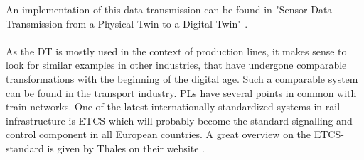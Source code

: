 An implementation of this data transmission can be found in "Sensor Data Transmission from a Physical Twin to a Digital Twin" \cite{AlaDTdataTransmission}.\\
\\
As the \ac{DT} is mostly used in the context of production lines, it makes sense to look for similar examples in other industries, that have undergone comparable transformations with the beginning of the digital age.
Such a comparable system can be found in the transport industry. 
\acp{PL} have several points in common with train networks.
One of the latest internationally standardized systems in rail infrastructure is \ac{ETCS} which will probably become the standard signalling and control component in all European countries. 
A great overview on the \ac{ETCS}-standard is given by Thales on their website \cite{ThalesETCS}.\\

























